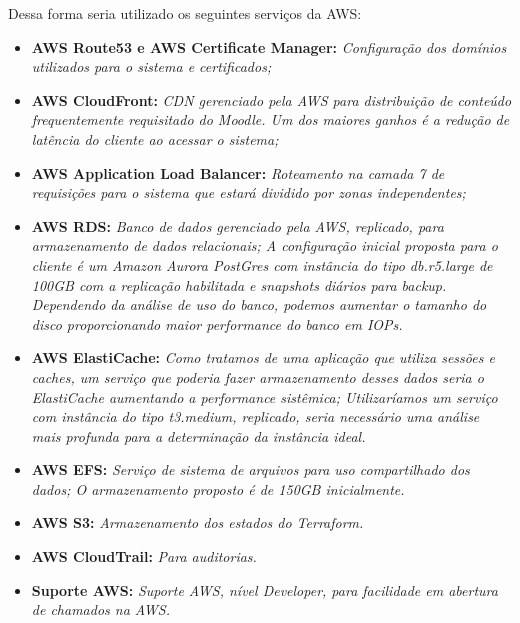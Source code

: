 \documentclass{article}
\begin{document}
Dessa forma seria utilizado os seguintes serviços da AWS:

\begin{itemize}
    \item \textbf{AWS Route53 e AWS Certificate Manager:} \textit{Configuração dos domínios utilizados para o sistema e certificados;}
    
    \item \textbf{AWS CloudFront:} \textit{CDN gerenciado pela AWS para distribuição de conteúdo frequentemente requisitado do Moodle. Um dos maiores ganhos é a redução de latência do cliente ao acessar o sistema;}

    \item \textbf{AWS Application Load Balancer:} \textit{Roteamento na camada 7 de requisições para o sistema que estará dividido por zonas independentes;}
    
    \item \textbf{AWS RDS:} \textit{Banco de dados gerenciado pela AWS, replicado, para armazenamento de dados relacionais; A configuração inicial proposta para o cliente é um Amazon Aurora PostGres com instância do tipo \textit{db.r5.large} de 100GB com a replicação habilitada e \textit{snapshots} diários para backup. Dependendo da análise de uso do banco, podemos aumentar o tamanho do disco proporcionando maior performance do banco em IOPs.}

    \item \textbf{AWS ElastiCache:} \textit{Como tratamos de uma aplicação que utiliza sessões e caches, um serviço que poderia fazer armazenamento desses dados seria o ElastiCache aumentando a performance sistêmica; Utilizaríamos um serviço com instância do tipo \textit{t3.medium}, replicado, seria necessário uma análise mais profunda para a determinação da instância ideal.}

    \item \textbf{AWS EFS:} \textit{Serviço de sistema de arquivos para uso compartilhado dos dados; O armazenamento proposto é de 150GB inicialmente.}
    
    \item \textbf{AWS S3:} \textit{Armazenamento dos estados do Terraform.}
    
    \item \textbf{AWS CloudTrail:} \textit{Para auditorias.}
    
    \item \textbf{Suporte AWS:} \textit{Suporte AWS, nível Developer, para facilidade em abertura de chamados na AWS.}
\end{itemize}
\end{document}
